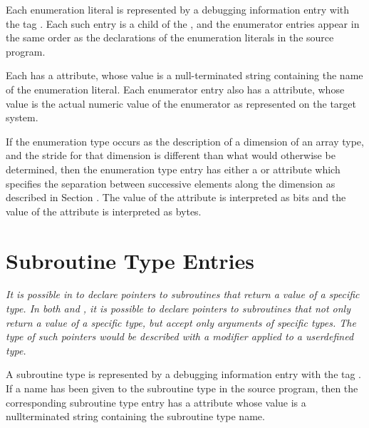 Each enumeration literal is represented by a debugging
information entry with the
tag \DWTAGenumeratorTARG.
Each
such entry is a child of the
, and the
enumerator entries appear in the same order as the declarations
of the enumeration literals in the source program.

Each  has a \DWATname{} attribute, whose
value is a null-terminated string containing the name of
the\hypertarget{chap:DWATconstvalueenumerationliteralvalue}{}
enumeration literal.
Each enumerator entry also has a
\DWATconstvalueDEFN{} attribute,
whose value is the actual numeric value of the enumerator as
represented on the target system.

If the enumeration type occurs as the description of a
dimension of an array type, and the stride for that
dimension\hypertarget{chap:DWATbytestrideenumerationstridedimensionofarraytype}{}
is different than what would otherwise be determined,
then\hypertarget{chap:DWATbitstrideenumerationstridedimensionofarraytype}{}
the enumeration type entry has either a
\DWATbytestrideDEFN{} or
\DWATbitstrideDEFN{} attribute which specifies the separation
between successive elements along the dimension as described
in Section .
The value of the \DWATbitstride{} attribute
is interpreted as bits and
the value of the \DWATbytestride{} attribute is interpreted
as bytes.

\section{Subroutine Type Entries}
\label{chap:subroutinetypeentries}

\textit{It is possible in 
to declare pointers to subroutines
that return a value of a specific type. In both
 and ,
it is possible to declare pointers to subroutines that not
only return a value of a specific type, but accept only
arguments of specific types. The type of such pointers would
be described with a  modifier applied to a
user\dash defined type.}

A subroutine type is represented by a debugging information
entry with the
tag \DWTAGsubroutinetypeTARG.
If a name has
been given to the subroutine type in the source program,
then the corresponding subroutine type entry has
a \DWATname{} attribute
whose value is a null\dash terminated string containing
the subroutine type name.

